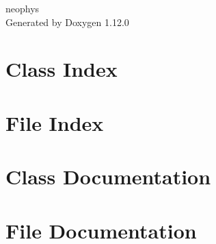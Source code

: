 \documentclass[twoside]{book}
\newcommand{\+}{\discretionary{\mbox{\scriptsize$\hookleftarrow$}}{}{}}
\newcommand{\clearemptydoublepage}{%
    \newpage{\pagestyle{empty}\cleardoublepage}%
  }
\begin{document}
  \raggedbottom
    \hypersetup{pageanchor=false,
                bookmarksnumbered=true,
                pdfencoding=unicode
               }
  \begin{titlepage}
  \vspace*{7cm}
  \begin{center}%
  {\Large neophys}\\
  \vspace*{1cm}
  {\large Generated by Doxygen 1.12.0}\\
  \end{center}
  \end{titlepage}
  \clearemptydoublepage
  \tableofcontents
  \clearemptydoublepage
  \hypersetup{pageanchor=true}
\chapter{Class Index}

\chapter{File Index}

\chapter{Class Documentation}



\chapter{File Documentation}








  \backmatter
  \newpage
  \clearemptydoublepage
  \printindex
\end{document}
